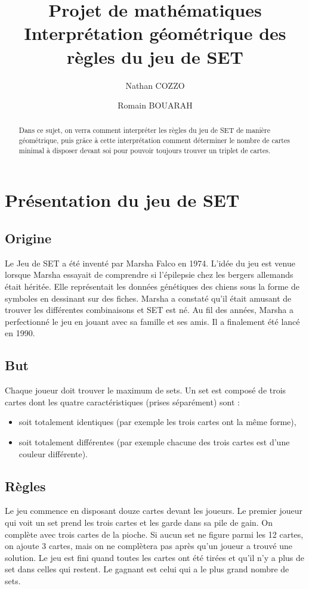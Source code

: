 \documentclass[a4paper,12pt,titlepage]{article}
\title{Projet de mathématiques \\
		\large Interprétation géométrique des règles du jeu de SET}
\author{Nathan COZZO \and Romain BOUARAH}
\theoremstyle{plain}
\theoremstyle{definition}
\begin{document}
\maketitle
\tableofcontents
\newpage

\begin{abstract}
Dans ce sujet, on verra comment interpréter les règles du jeu de SET de manière géométrique, puis grâce à cette interprétation comment déterminer le nombre de cartes minimal à disposer devant soi pour pouvoir toujours trouver un triplet de cartes.
\end{abstract}

\section{Présentation du jeu de SET}
\subsection{Origine}
Le Jeu de SET a été inventé par Marsha Falco en 1974. L'idée du jeu est venue lorsque Marsha essayait de comprendre si l'épilepsie chez les bergers allemands était héritée. 
Elle représentait les données génétiques des chiens sous la forme de symboles en dessinant sur des fiches. 
Marsha a constaté qu'il était amusant de trouver les différentes combinaisons et SET est né. Au fil des années, Marsha a perfectionné le jeu en jouant avec sa famille et ses amis. Il a finalement été lancé en 1990.

\subsection{But}
Chaque joueur doit trouver le maximum de sets. Un set est composé de trois cartes dont les quatre caractéristiques (prises séparément) sont : 
\begin{itemize}
\item soit totalement identiques (par exemple les trois cartes ont la même forme),
\item soit totalement différentes (par exemple chacune des trois cartes est d'une couleur différente).
\end{itemize}

\subsection{Règles}
Le jeu commence en disposant douze cartes devant les joueurs. Le premier joueur qui voit un set prend les trois cartes et les garde dans sa pile de gain. On complète avec trois cartes de la pioche. Si aucun set ne figure parmi les 12 cartes, on ajoute 3 cartes, mais on ne complètera pas après qu'un joueur a trouvé une solution.
Le jeu est fini quand toutes les cartes ont été tirées et qu'il n'y a plus de set dans celles qui restent. Le gagnant est celui qui a le plus grand nombre de sets. 
\end{document}
